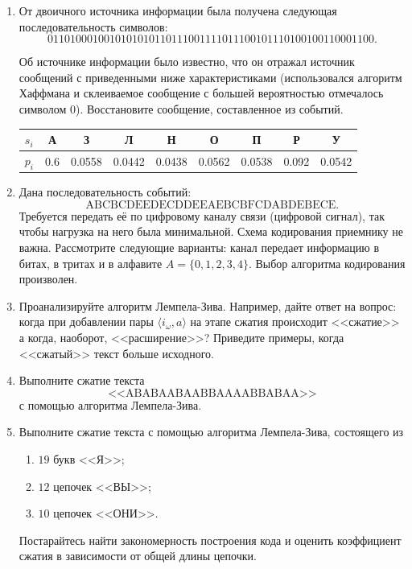 \begin{enumerate}
    \item От двоичного источника информации была получена следующая последовательность символов: 
    \[0110100010010101010110111001111011100101110100100110001100.\] 
    
    Об источнике информации было известно, что он отражал источник сообщений с приведенными ниже характеристиками (использовался алгоритм Хаффмана и склеиваемое сообщение с большей вероятностью отмечалось символом 0). Восстановите сообщение, составленное из событий.
    
    \begin{tabular}{|l||c|c|c|c|c|c|c|c|}
        \hline
        $s_i$   &А    &З        &Л      &Н      &О      &П      &Р      &У\\ \hline
        $p_i$   &0.6  &0.0558   &0.0442 &0.0438 &0.0562 &0.0538 &0.092  &0.0542\\ \hline
    \end{tabular}
    
    \item Дана последовательность событий: 
    \[\text{ABCBCDEEDECDDEEAEBCBFCDABDEBECE}.\] 
    Требуется передать её по цифровому каналу связи (цифровой сигнал), так чтобы нагрузка на него была минимальной. Схема кодирования приемнику не важна. Рассмотрите следующие варианты: канал передает информацию в битах, в тритах и в алфавите $A=\{0, 1, 2, 3, 4\}$. Выбор алгоритма кодирования произволен.
    
    \item Проанализируйте алгоритм Лемпела-Зива. Например, дайте ответ на вопрос: когда при добавлении пары $\langle i_\omega,a\rangle$ на этапе сжатия происходит <<сжатие>> а когда, наоборот, <<расширение>>? Приведите примеры, когда <<сжатый>> текст больше исходного.
    
    \item Выполните сжатие текста 
    \[\text{<<ABABAABAABBAAAABBABAA>>}\] с помощью алгоритма Лемпела-Зива.
    
    \item Выполните сжатие текста с помощью алгоритма Лемпела-Зива, состоящего из 
    \begin{enumerate}
        \item $19$ букв <<Я>>;
        \item $12$ цепочек <<ВЫ>>;
        \item $10$ цепочек <<ОНИ>>.
    \end{enumerate}
    
    Постарайтесь найти закономерность построения кода и оценить коэффициент сжатия в зависимости от общей длины цепочки.
    

\end{enumerate}

